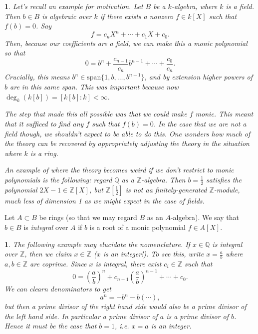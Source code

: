 \documentclass[12pt]{article}
\newtheorem{para}[theorem]{}
\begin{document}
\begin{para}
	Let's recall an example for motivation. Let $B$ be a $k$-algebra, where $k$ is a field. Then $b\in B$ is algebraic over $k$ if there exists a nonzero $f\in k[X]$ such that $f(b)=0$. Say 
	\begin{equation*}
		f = c_nX^n + \cdots + c_1X + c_0.
	\end{equation*}
	Then, because our coefficients are a field, we can make this a monic polynomial so that 
	\begin{equation*}
		0 = b^n + \frac{c_{n-1}}{c_n}b^{n-1} + \cdots + \frac{c_0}{c_n}.
	\end{equation*}
	Crucially, this means $b^n\in\text{span}\{1,b,\dots,b^{n-1}\}$, and by extension higher powers of $b$ are in this same span. This was important because now $\deg_k(k[b])=[k[b]:k]<\infty$.

	The step that made this all possible was that we could make $f$ monic. This meant that it sufficed to find any $f$ such that $f(b)=0$. In the case that we are not a field though, we shouldn't expect to be able to do this. One wonders how much of the theory can be recovered by appropriately adjusting the theory in the situation where $k$ is a ring.

	An example of where the theory becomes weird if we don't restrict to monic polynomials is the following: regard $\mathbb{Q}$ as a $\mathbb{Z}$-algebra. Then $b=\frac{1}{2}$ satisfies the polynomial $2X-1\in \mathbb{Z}[X]$, but $\mathbb{Z}[\frac{1}{2}]$ is not aa finitely-generated $\mathbb{Z}$-module, much less of dimension 1 as we might expect in the case of fields.
\end{para}

\begin{definition}
	Let $A\subset B$ be rings (so that we may regard $B$ as an $A$-algebra). We say that $b\in B$ is \emph{integral} over $A$ if $b$ is a root of a monic polynomial $f\in A[X]$.
\end{definition}

\begin{para}
	The following example may elucidate the nomenclature. If $x\in \mathbb{Q}$ is integral over $\mathbb{Z}$, then we claim $x\in \mathbb{Z}$ ($x$ is an integer!). To see this, write $x=\frac{a}{b}$ where $a,b\in\mathbb{Z}$ are coprime. Since $x$ is integral, there exist $c_i\in\mathbb{Z}$ such that 
	\begin{equation*}
		0 = \left(\frac{a}{b}\right)^n + c_{n-1}\left(\frac{a}{b}\right)^{n-1} + \cdots + c_0.
	\end{equation*}
	We can clearn denominators to get 
	\begin{equation*}
		a^n = -b^n - b(\cdots),
	\end{equation*}
	but then a prime divisor of the right hand side would also be a prime divisor of the left hand side. In particular a prime divisor of $a$ is a prime divisor of $b$. Hence it must be the case that $b=1$, i.e. $x=a$ is an integer.
\end{para}
\end{document}
